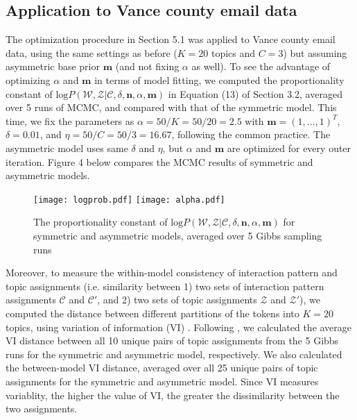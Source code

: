 \documentclass[a4paper]{article}
\begin{document}
\subsection{Application to Vance county email data}
The optimization procedure in Section 5.1 was applied to Vance county email data, using the same settings as before ($K=20$ topics and $C=3$) but assuming asymmetric base prior $\boldsymbol{m}$ (and not fixing $\alpha$ as well). To see the advantage of optimizing $\alpha$ and $\boldsymbol{m}$ in terms of model fitting, we computed the proportionality constant of $\mbox{log}P(\mathcal{W},\mathcal{Z}|\mathcal{C}, \delta, \boldsymbol{n}, \alpha, \boldsymbol{m})$ in Equation (13) of Section 3.2,  averaged over 5 runs of MCMC, and compared with that of the symmetric model. This time, we fix the parameters as $\alpha=50/K=50/20=2.5$ with $\boldsymbol{m}=(1,...,1)^T$, $\delta=0.01$, and $\eta=50/C=50/3=16.67$, following the common practice. The asymmetric model uses same $\delta$ and $\eta$, but $\alpha$ and $\boldsymbol{m}$ are optimized for every outer iteration. Figure 4 below compares the MCMC results of symmetric and asymmetric models. 
\begin{figure}[ht]
	\centering
	\texttt{[image: logprob.pdf]} 
		\texttt{[image: alpha.pdf]} 
	\caption{The proportionality constant of $\mbox{log}P(\mathcal{W},\mathcal{Z}|\mathcal{C}, \delta, \boldsymbol{n}, \alpha, \boldsymbol{m})$ for symmetric and asymmetric models, averaged over 5 Gibbs sampling runs}
	\label{fig:logPL}
\end{figure}
\newline Moreover, to measure the within-model consistency of interaction pattern and topic assignments (i.e. similarity between 1) two sets of interaction pattern assignments $\mathcal{C}$ and $\mathcal{C'}$, and 2) two sets of topic
assignments $\mathcal{Z}$ and $\mathcal{Z'}$), we computed the distance between different partitions
of the tokens into $K=20$ topics, using variation
of information (VI) \citep{meilua2003comparing}. Following \cite{wallach2009rethinking}, we calculated
the average VI distance between all 10 unique pairs of topic assignments from the 5 Gibbs runs for the symmetric and asymmetric model, respectively. We also calculated the between-model
VI distance, averaged over all 25 unique pairs of topic assignments for the symmetric and asymmetric model. Since VI measures variablity, the higher the value of VI, the greater the dissimilarity between the two assignments.\\
\end{document}
